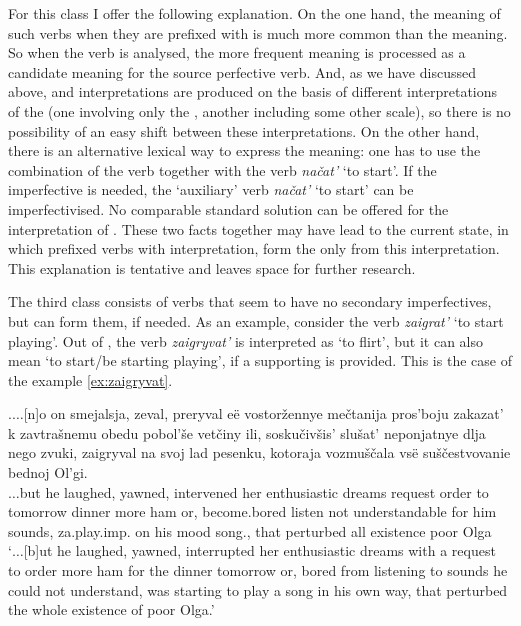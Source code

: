 For this class I offer the following explanation. On the one hand, the  meaning of such verbs when they are prefixed with  is much more common than the  meaning. So when the  verb is analysed, the more frequent meaning is processed as a candidate meaning for the source perfective verb. And, as we have discussed above,  and  interpretations are produced on the basis of different interpretations of the  (one involving only the , another including some other scale), so there is no possibility of an easy shift between these interpretations. On the other hand, there is an alternative lexical way to express the  meaning: one has to use the combination of the  verb together with the verb \textit{na\v{c}at'} `to start'. If the imperfective is needed, the `auxiliary' verb \textit{na\v{c}at'} `to start' can be imperfectivised. No comparable standard solution can be offered for the  interpretation of . These two facts together may have lead to the current state, in which prefixed verbs with  interpretation, form the  only from this interpretation. This explanation is tentative and leaves space for further research.

The third class consists of verbs that seem to have no secondary imperfectives, but can form them, if needed. As an example, consider the verb \textit{zaigrat'} `to start playing'. Out of , the verb \textit{zaigryvat'} is interpreted as `to flirt', but it can also mean `to start/be starting playing', if a supporting  is provided. This is the case of the example \ref{ex:zaigryvat}. 

\exg.\label{ex:zaigryvat}$\ldots$[n]o on smejalsja, zeval, preryval e\"{e} vostor\v{z}ennye me\v{c}tanija pros'boju zakazat' k zavtra\v{s}nemu obedu pobol'\v{s}e vet\v{c}iny ili, sosku\v{c}iv\v{s}is' slu\v{s}at' neponjatnye dlja nego zvuki, zaigryval na svoj lad pesenku, kotoraja vozmu\v{s}\v{c}ala vs\"{e} su\v{s}\v{c}estvovanie bednoj Ol'gi.\\
$\ldots$but he laughed, yawned, intervened her enthusiastic dreams request order to tomorrow dinner more ham or, {become.bored} listen {not understandable} for him sounds, za.play.imp. on his mood song., that perturbed all existence poor Olga\\
\trans `$\ldots$[b]ut he laughed, yawned, interrupted her enthusiastic dreams with a request to order more ham for the dinner tomorrow or, bored from listening to sounds he could not understand, was starting to play a song in his own way, that perturbed the whole existence of poor Olga.'\\

